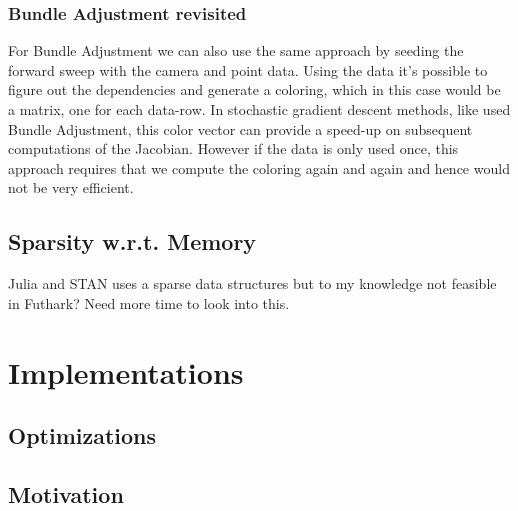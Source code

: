 \subsubsection{Bundle Adjustment revisited}
For Bundle Adjustment we can also use the same approach by seeding the forward sweep 
with the camera and point data. Using the data it's possible to figure out the dependencies and generate a 
coloring, which in this case would be a matrix, one for each data-row. 
In stochastic gradient descent methods, like used Bundle Adjustment, this color vector can provide a speed-up on subsequent 
computations of the Jacobian. 
However if the data is only used once, this approach requires that we compute the coloring again and again
and hence would not be very efficient. 



\subsection{Sparsity w.r.t. Memory}
Julia and STAN uses a sparse data structures but to my knowledge not feasible in Futhark?
Need more time to look into this. 


\section{Implementations}
\subsection{Optimizations}
\subsection{Motivation}


%
%
%
%
%
%




\newpage
\nocite{*}
\printbibliography


